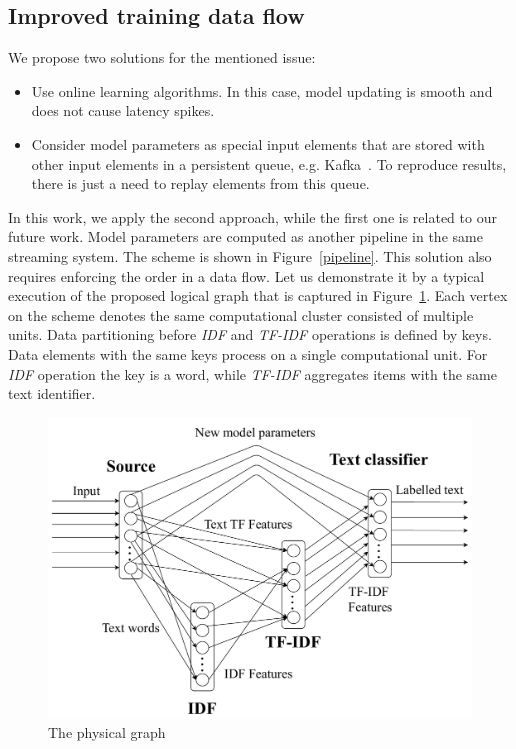 \subsection{Improved training data flow}

We propose two solutions for the mentioned issue:

\begin{itemize}
    \item Use online learning algorithms. In this case, model updating is smooth and does not cause latency spikes.
    \item Consider model parameters as special input elements that are stored with other input elements in a persistent queue, e.g. Kafka~\cite{kreps2011kafka}. To reproduce results, there is just a need to replay elements from this queue.
\end{itemize}

In this work, we apply the second approach, while the first one is related to our future work. Model parameters are computed as another pipeline in the same streaming system. The scheme is shown in Figure~\ref{pipeline}. This solution also requires enforcing the order in a data flow. Let us demonstrate it by a typical execution of the proposed logical graph that is captured in Figure~\ref{physical_graph}. Each vertex on the scheme denotes the same computational cluster consisted of multiple units. Data partitioning before {\em IDF} and {\em TF-IDF} operations is defined by keys. Data elements with the same keys process on a single computational unit. For {\em IDF} operation the key is a word, while {\em TF-IDF} aggregates items with the same text identifier. 

\begin{figure}[htbp]
  \centering
  \includegraphics[scale=0.375]{pics/physical-graph}
  \caption{The physical graph}
  \label {physical_graph}
\end{figure}

